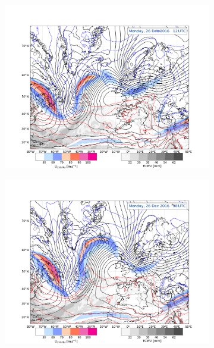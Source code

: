 \begin{figure}[ht!]
	\begin{subfigure}[b]{0.49\textwidth}
		\includegraphics[trim={4.2cm 0cm 4.3cm 5.1cm},clip,
		width=\textwidth]{./fig_Geopot_Jet/20161226_12}
		\caption{} \label{fig:GP26}
	\end{subfigure}
	\begin{subfigure}[b]{0.49\textwidth}
		\includegraphics[trim={4.2cm 0cm 4.3cm 5.1cm},clip,
		width=\textwidth]{./fig_Geopot_Jet/20161226_18}
		\caption{} \label{fig:GP26_18}
	\end{subfigure}
	\begin{subfigure}[b]{0.49\textwidth}

\end{subfigure}
\end{figure}
